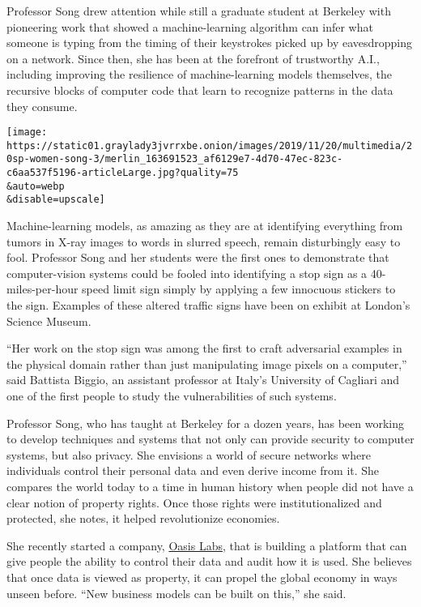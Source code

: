 Professor Song drew attention while still a graduate student at Berkeley
with pioneering work that showed a machine-learning algorithm can infer
what someone is typing from the timing of their keystrokes picked up by
eavesdropping on a network. Since then, she has been at the forefront of
trustworthy A.I., including improving the resilience of machine-learning
models themselves, the recursive blocks of computer code that learn to
recognize patterns in the data they consume.

\texttt{[image: https://static01.graylady3jvrrxbe.onion/images/2019/11/20/multimedia/20sp-women-song-3/merlin\_163691523\_af6129e7-4d70-47ec-823c-c6aa537f5196-articleLarge.jpg?quality=75\\\&auto=webp\\\&disable=upscale]}

Machine-learning models, as amazing as they are at identifying
everything from tumors in X-ray images to words in slurred speech,
remain disturbingly easy to fool. Professor Song and her students were
the first ones to demonstrate that computer-vision systems could be
fooled into identifying a stop sign as a 40-miles-per-hour speed limit
sign simply by applying a few innocuous stickers to the sign. Examples
of these altered traffic signs have been on exhibit at London's Science
Museum.

``Her work on the stop sign was among the first to craft adversarial
examples in the physical domain rather than just manipulating image
pixels on a computer,'' said Battista Biggio, an assistant professor at
Italy's University of Cagliari and one of the first people to study the
vulnerabilities of such systems.

Professor Song, who has taught at Berkeley for a dozen years, has been
working to develop techniques and systems that not only can provide
security to computer systems, but also privacy. She envisions a world of
secure networks where individuals control their personal data and even
derive income from it. She compares the world today to a time in human
history when people did not have a clear notion of property rights. Once
those rights were institutionalized and protected, she notes, it helped
revolutionize economies.

She recently started a company, \href{https://www.oasislabs.com/}{Oasis
Labs}, that is building a platform that can give people the ability to
control their data and audit how it is used. She believes that once data
is viewed as property, it can propel the global economy in ways unseen
before. ``New business models can be built on this,'' she said.

